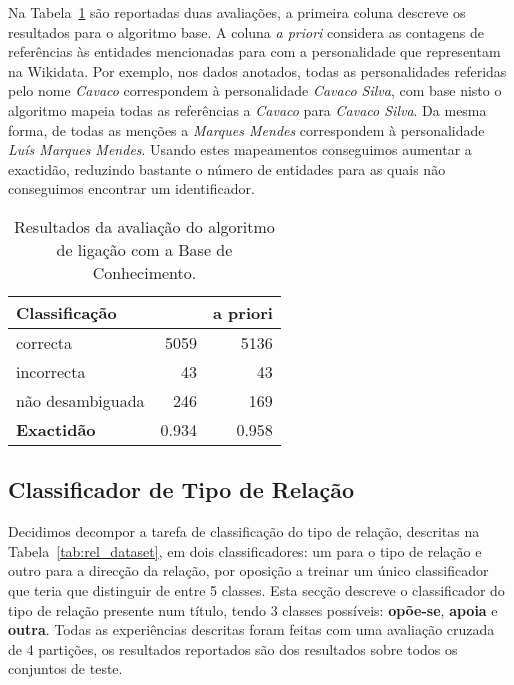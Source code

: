 \documentclass[a4paper, twocolumn, 11pt, twoside]{article}
\begin{document}
Na Tabela~\ref{tab:ent_linking_results} são reportadas duas avaliações, a primeira coluna descreve os resultados para o algoritmo base. A coluna \textit{a priori} considera as contagens de referências às entidades mencionadas para com a personalidade que representam na Wikidata. Por exemplo, nos dados anotados, todas as personalidades referidas pelo nome \textit{Cavaco} correspondem à personalidade \textit{Cavaco Silva}, com base nisto o algoritmo mapeia todas as referências a \textit{Cavaco} para \textit{Cavaco Silva}. Da mesma forma, de todas as menções a \textit{Marques Mendes} correspondem à personalidade \textit{Luís Marques Mendes}. Usando estes mapeamentos conseguimos aumentar a exactidão, reduzindo bastante o número de entidades para as quais não conseguimos encontrar um identificador.

\begin{table}
    \begin{center}
    \begin{tabular}{l rr}
        {\bf Classificação} &               & {\bf a priori} \\
        \hline
        correcta            &   5059        &  5136    \\
        incorrecta          &     43        &    43    \\
		não desambiguada    &    246        &   169    \\    
        \hline
		{\bf Exactidão }    &  0.934	    &  0.958   \\
    \end{tabular}
	\caption{Resultados da avaliação do algoritmo de ligação com a Base de Conhecimento.}
	\label{tab:ent_linking_results}
	\end{center}
\end{table}

\subsection{Classificador de Tipo de Relação}
\label{subsec:rel_classifier}

Decidimos decompor a tarefa de classificação do tipo de relação, descritas na Tabela~\ref{tab:rel_dataset}, em dois classificadores: um para o tipo de relação e outro para a direcção da relação, por oposição a treinar um único classificador que teria que distinguir de entre 5 classes. Esta secção descreve o classificador do tipo de relação presente num título, tendo 3 classes possíveis: \textbf{opõe-se}, \textbf{apoia} e \textbf{outra}. Todas as experiências descritas foram feitas com uma avaliação cruzada de 4 partições, os resultados reportados são dos resultados sobre todos os conjuntos de teste.
\end{document}

